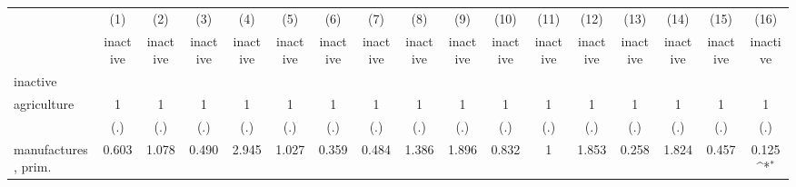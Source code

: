 {
\def\sym#1{\ifmmode^{#1}\else\(^{#1}\)\fi}
\begin{tabular}{l*{16}{c}}
\hline\hline
                    &\multicolumn{1}{c}{(1)}&\multicolumn{1}{c}{(2)}&\multicolumn{1}{c}{(3)}&\multicolumn{1}{c}{(4)}&\multicolumn{1}{c}{(5)}&\multicolumn{1}{c}{(6)}&\multicolumn{1}{c}{(7)}&\multicolumn{1}{c}{(8)}&\multicolumn{1}{c}{(9)}&\multicolumn{1}{c}{(10)}&\multicolumn{1}{c}{(11)}&\multicolumn{1}{c}{(12)}&\multicolumn{1}{c}{(13)}&\multicolumn{1}{c}{(14)}&\multicolumn{1}{c}{(15)}&\multicolumn{1}{c}{(16)}\\
                    &\multicolumn{1}{c}{inactive}&\multicolumn{1}{c}{inactive}&\multicolumn{1}{c}{inactive}&\multicolumn{1}{c}{inactive}&\multicolumn{1}{c}{inactive}&\multicolumn{1}{c}{inactive}&\multicolumn{1}{c}{inactive}&\multicolumn{1}{c}{inactive}&\multicolumn{1}{c}{inactive}&\multicolumn{1}{c}{inactive}&\multicolumn{1}{c}{inactive}&\multicolumn{1}{c}{inactive}&\multicolumn{1}{c}{inactive}&\multicolumn{1}{c}{inactive}&\multicolumn{1}{c}{inactive}&\multicolumn{1}{c}{inactive}\\
\hline
inactive            &                     &                     &                     &                     &                     &                     &                     &                     &                     &                     &                     &                     &                     &                     &                     &                     \\
agriculture         &           1         &           1         &           1         &           1         &           1         &           1         &           1         &           1         &           1         &           1         &           1         &           1         &           1         &           1         &           1         &           1         \\
                    &         (.)         &         (.)         &         (.)         &         (.)         &         (.)         &         (.)         &         (.)         &         (.)         &         (.)         &         (.)         &         (.)         &         (.)         &         (.)         &         (.)         &         (.)         &         (.)         \\
[1em]
manufactures, prim. &       0.603         &       1.078         &       0.490         &       2.945         &       1.027         &       0.359         &       0.484         &       1.386         &       1.896         &       0.832         &           1         &       1.853         &       0.258         &       1.824         &       0.457         &       0.125\sym{*}  \\

\end{tabular}}
